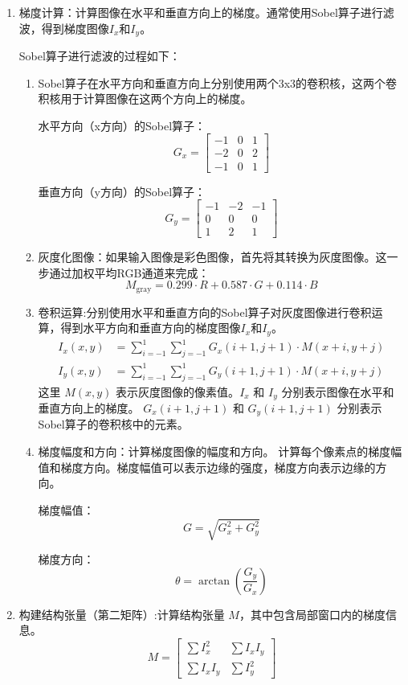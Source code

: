 \documentclass{lzureport}
\begin{document}
\begin{enumerate}[label=\arabic*)]
	\item 梯度计算：计算图像在水平和垂直方向上的梯度。通常使用Sobel算子进行滤波，得到梯度图像$I_x$和$I_y$。

	Sobel算子进行滤波的过程如下：
	\begin{enumerate}[itemindent=1em,label=(\arabic*)]
		\item Sobel算子在水平方向和垂直方向上分别使用两个3x3的卷积核，这两个卷积核用于计算图像在这两个方向上的梯度。

		水平方向（x方向）的Sobel算子：
		$$G_x=\begin{bmatrix}-1&0&1\\-2&0&2\\-1&0&1\end{bmatrix}$$
		
		垂直方向（y方向）的Sobel算子：
		$$G_y=\begin{bmatrix}-1&-2&-1\\0&0&0\\1&2&1\end{bmatrix}$$
		\item 灰度化图像：如果输入图像是彩色图像，首先将其转换为灰度图像。这一步通过加权平均RGB通道来完成：
		$$M_{\mathrm{gray}}=0.299\cdot R+0.587\cdot G+0.114\cdot B$$

		\item 卷积运算:分别使用水平和垂直方向的Sobel算子对灰度图像进行卷积运算，得到水平方向和垂直方向的梯度图像$I_x$和$I_y$。
		$$
		\begin{aligned}I_x(x,y)&=\sum_{i=-1}^1\sum_{j=-1}^1G_x(i+1,j+1)\cdot M(x+i,y+j)\\
			I_y(x,y)&=\sum_{i=-1}^1\sum_{j=-1}^1G_y(i+1,j+1)\cdot M(x+i,y+j)
		\end{aligned}
		$$
		这里 $M(x,y)$ 表示灰度图像的像素值。$I_x$ 和 $I_y$ 分别表示图像在水平和垂直方向上的梯度。 $G_x(i+1, j+1)$ 和 $G_y(i+1, j+1)$ 分别表示Sobel算子的卷积核中的元素。

		\item 梯度幅度和方向：计算梯度图像的幅度和方向。
		计算每个像素点的梯度幅值和梯度方向。梯度幅值可以表示边缘的强度，梯度方向表示边缘的方向。

		梯度幅值：
		$$G=\sqrt{G_x^2+G_y^2}$$

		梯度方向：
		$$\theta=\arctan\left(\frac{G_y}{G_x}\right)$$
	\end{enumerate}
	
	\item 构建结构张量（第二矩阵）:计算结构张量 $M$，其中包含局部窗口内的梯度信息。
	$$M=\begin{bmatrix}\sum I_x^2&\sum I_xI_y\\\sum I_xI_y&\sum I_y^2\end{bmatrix}$$


\end{enumerate}
\end{document}
